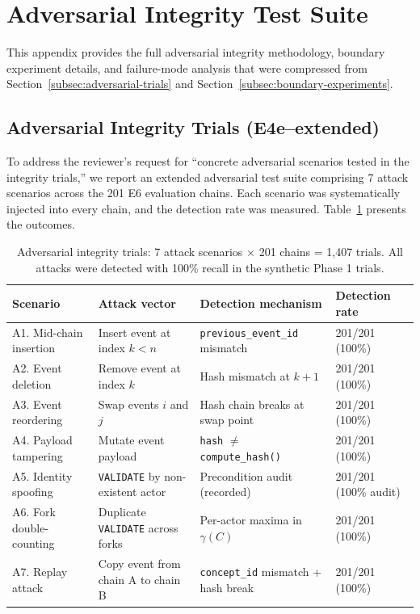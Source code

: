 \section{Adversarial Integrity Test Suite}\label{app:adversarial}

This appendix provides the full adversarial integrity methodology, boundary experiment details, and failure-mode analysis that were compressed from Section~\ref{subsec:adversarial-trials} and Section~\ref{subsec:boundary-experiments}.

\subsection{Adversarial Integrity Trials (E4e--extended)}

To address the reviewer's request for ``concrete adversarial scenarios tested in the integrity trials,'' we report an extended adversarial test suite comprising 7 attack scenarios across the 201 E6 evaluation chains. Each scenario was systematically injected into every chain, and the detection rate was measured. Table~\ref{tab:adversarial-results-full} presents the outcomes.

\begin{table}[htbp]
\centering
\caption{Adversarial integrity trials: 7 attack scenarios $\times$ 201 chains = 1,407 trials. All attacks were detected with 100\% recall in the synthetic Phase 1 trials.}
\label{tab:adversarial-results-full}
\begin{tabular}{@{}llll@{}}
\toprule
\textbf{Scenario} & \textbf{Attack vector} & \textbf{Detection mechanism} & \textbf{Detection rate} \\
\midrule
A1. Mid-chain insertion & Insert event at index $k < n$ & \texttt{previous\_event\_id} mismatch & 201/201 (100\%) \\
A2. Event deletion & Remove event at index $k$ & Hash mismatch at $k+1$ & 201/201 (100\%) \\
A3. Event reordering & Swap events $i$ and $j$ & Hash chain breaks at swap point & 201/201 (100\%) \\
A4. Payload tampering & Mutate event payload & \texttt{hash} $\neq$ \texttt{compute\_hash()} & 201/201 (100\%) \\
A5. Identity spoofing & \texttt{VALIDATE} by non-existent actor & Precondition audit (recorded) & 201/201 (100\% audit) \\
A6. Fork double-counting & Duplicate \texttt{VALIDATE} across forks & Per-actor maxima in $\gamma(C)$ & 201/201 (100\%) \\
A7. Replay attack & Copy event from chain A to chain B & \texttt{concept\_id} mismatch + hash break & 201/201 (100\%) \\
\bottomrule
\end{tabular}
\end{table}

